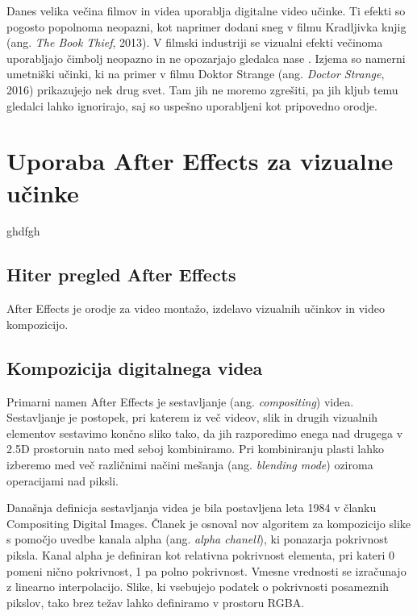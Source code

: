 \documentclass[a4paper, 12pt]{book}
\begin{document}
Danes velika večina filmov in videa uporablja digitalne video učinke. 
Ti efekti so pogosto popolnoma neopazni, kot naprimer dodani sneg v filmu Kradljivka knjig (ang. {\it The Book Thief}, 2013).
V filmski industriji se vizualni efekti večinoma uporabljajo čimbolj neopazno in ne opozarjajo gledalca nase \cite{vesHandbook}.
Izjema so namerni umetniški učinki, ki na primer v filmu Doktor Strange (ang. {\it Doctor Strange}, 2016) prikazujejo nek drug svet. 
Tam jih ne moremo zgrešiti, pa jih kljub temu gledalci lahko ignorirajo, saj so uspešno uporabljeni kot pripovedno orodje.


\chapter{Uporaba After Effects za vizualne učinke}

ghdfgh

\section{Hiter pregled After Effects}

After Effects je orodje za video montažo, izdelavo vizualnih učinkov in video kompozicijo.

\section{Kompozicija digitalnega videa}

Primarni namen After Effects je sestavljanje (ang. {\it compositing}) videa.
Sestavljanje je postopek, pri katerem iz več videov, slik in drugih vizualnih elementov sestavimo končno sliko tako,
da jih razporedimo enega nad drugega v 2.5D prostoru\footnotemark in nato med seboj kombiniramo\cite{siggraphComposition}.
Pri kombiniranju plasti lahko izberemo med več različnimi načini mešanja (ang. {\it blending mode}) oziroma operacijami nad piksli.

Današnja definicja sestavljanja videa je bila postavljena leta 1984 v članku Compositing Digital Images\cite{siggraphComposition}.
Članek je osnoval nov algoritem za kompozicijo slike s pomočjo uvedbe kanala alpha (ang. {\it alpha chanell}), ki ponazarja pokrivnost piksla.
Kanal alpha je definiran kot relativna pokrivnost elementa, pri kateri 0 pomeni nično pokrivnost, 1 pa polno pokrivnost.
Vmesne vrednosti se izračunajo z linearno interpolacijo.
Slike, ki vsebujejo podatek o pokrivnosti posameznih pikslov, tako brez težav lahko definiramo v prostoru RGBA.
\end{document}
